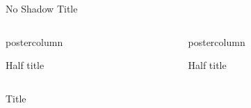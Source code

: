 \documentclass{beamer}
\begin{document}
\begin{frame}
\vspace{0.8cm}
\begin{BRLblock}[colframe=white,no shadow]{No Shadow Title}
	\blindtext
\end{BRLblock}
\vspace{0.8cm}

\begin{columns}[t]
	\begin{column}{.39\textwidth}
		\begin{beamercolorbox}[center,wd=\textwidth]{postercolumn}
			\begin{BRLblock}[equal height group=B]{Half title}
				\blindtext
			\end{BRLblock}\vfill
		\end{beamercolorbox}
	\end{column}
	\hspace{15pt}
	\begin{column}{.59\textwidth}
		\begin{beamercolorbox}[center,wd=\textwidth]{postercolumn}
			\begin{BRLblock}[equal height group=B]{Half title}
				\blindtext
			\end{BRLblock}
		\end{beamercolorbox}
	\end{column}
\end{columns}

\vspace{1.8cm}
\begin{BRLblock}{Title}
\blindtext
\end{BRLblock}
\vspace{0.4cm}

\end{frame}
\end{document}
